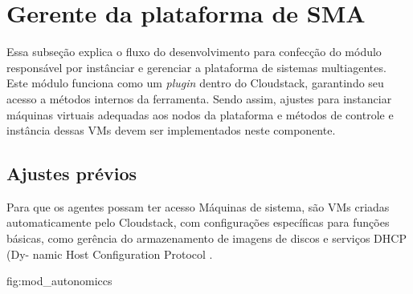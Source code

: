 \section{Gerente da plataforma de SMA}\label{sec:gerente_plat_sma}

Essa subseção explica o fluxo do desenvolvimento para confecção do módulo responsável por instânciar e gerenciar a plataforma de sistemas multiagentes. Este módulo funciona como um \textit{plugin} dentro do Cloudstack, garantindo seu acesso a métodos internos da ferramenta. Sendo assim, ajustes para instanciar máquinas virtuais adequadas aos nodos da plataforma e métodos de controle e instância dessas VMs devem ser implementados neste componente.

\subsection{Ajustes prévios}

Para que os agentes possam ter acesso Máquinas de sistema, são VMs criadas automaticamente pelo Cloudstack, com configurações específicas para funções básicas, como gerência do armazenamento de imagens de discos e serviços DHCP (Dy-
namic Host Configuration Protocol \cite{gabriel}. 

{fig:mod_autonomiccs}